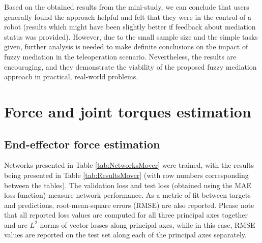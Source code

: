 Based on the obtained results from the mini-study, we can conclude that users generally found the approach helpful and felt that they were in the control of a robot (results which might have been slightly better if feedback about mediation status was provided). However, due to the small sample size and the simple tasks given, further analysis is needed to make definite conclusions on the impact of fuzzy mediation in the teleoperation scenario. Nevertheless, the results are encouraging, and they demonstrate the viability of the proposed fuzzy mediation approach in practical, real-world problems.

\section{Force and joint torques estimation}

\subsection{End-effector force estimation}
\label{sec:ResultsEE}

Networks presented in Table \ref{tab:NetworksMover} were trained, with the results being presented in Table \ref{tab:ResultsMover} (with row numbers corresponding between the tables). The validation loss and test loss (obtained using the MAE loss function) measure network performance.  As a metric of fit between targets and predictions, root-mean-square errors (RMSE) are also reported. Please note that all reported loss values are computed for all three principal axes together and are $L^2$ norms of vector losses along principal axes, while in this case, RMSE values are reported on the test set along each of the principal axes separately.

